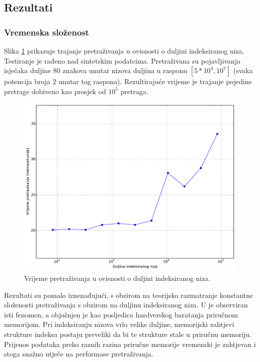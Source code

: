 \documentclass[times, utf8, seminar, numeric]{fer}
\begin{document}
\subsection{Rezultati}

\subsubsection{Vremenska složenost}

Slika \ref{fig:test_res_seq_len_time} prikazuje
trajanje pretraživanja u ovisnosti o duljini indeksiranog niza.
Testiranje je rađeno nad sintetskim podatcima.
Pretraživana su pojavljivanja isječaka duljine 80 znakova unutar nizova duljina u rasponu
$[5 * 10^3, 10^7]$ (svaka potencija broja $2$ unutar tog raspona). Rezultirajuće vrijeme je trajanje
pojedine pretrage dobiveno kao prosjek od $10^5$ pretraga.

\begin{figure}[!htb]
\centering
\includegraphics[width=\textwidth]{fig/test_res_seq_len.pdf}
\caption{Vrijeme pretraživanja u ovisnosti o duljini indeksiranog niza.}
\label{fig:test_res_seq_len_time}
\end{figure}

Rezultati su pomalo iznenađujući, s obzirom na teorijsko razmatranje konstantne složenosti
pretraživanja s obzirom na duljinu indeksiranog niza. U \cite{singer_2012} je observiran
isti fenomen, a objašnjen je kao posljedica hardverskog baratanja priručnom memorijom. Pri indeksiranju
nizova vrlo velike duljine, memorijski zahtjevi strukture indeksa postaju preveliki da bi
te strukture stale u priručnu memoriju. Prijenos podataka preko raznih razina priručne memorije
vremenski je zahtjevan i stoga snažno utječe na performase pretraživanja.
\end{document}
